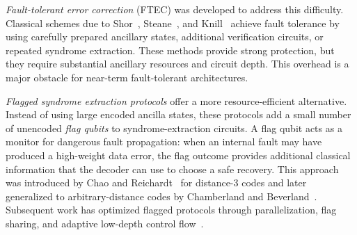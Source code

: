 \documentclass[acmsmall,screen,review,anonymous,nonacm]{acmart}
\begin{document}

\emph{Fault-tolerant error correction} (FTEC) was developed to address this difficulty. Classical schemes due to Shor~\cite{Shor96}, Steane~\cite{Steane97}, and Knill~\cite{Knill05} achieve fault tolerance by using carefully prepared ancillary states, additional verification circuits, or repeated syndrome extraction. These methods provide strong protection, but they require substantial ancillary resources and circuit depth. This overhead is a major obstacle for near-term fault-tolerant architectures.



\emph{Flagged syndrome extraction protocols} offer a more resource-efficient alternative. Instead of using large encoded ancilla states, these protocols add a small number of unencoded \emph{flag qubits} to syndrome-extraction circuits. A flag qubit acts as a monitor for dangerous fault propagation: when an internal fault may have produced a high-weight data error, the flag outcome provides additional classical information that the decoder can use to choose a safe recovery. This approach was introduced by Chao and Reichardt~\cite{CR18a} for distance-3 codes and later generalized to arbitrary-distance codes by Chamberland and Beverland~\cite{CB18}. Subsequent work has optimized flagged protocols through parallelization, flag sharing, and adaptive low-depth control flow~\cite{reichardt2021fault,LL23,Liou25,Du24,low-depth}.
\end{document}
